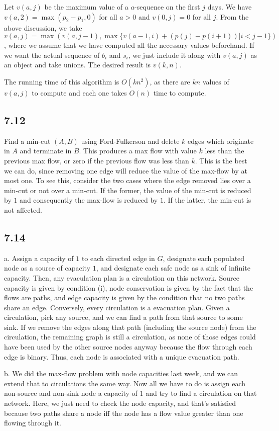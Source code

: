 \documentclass{article}
\begin{document}
Let $v(a,j)$ be the maximum value of a $a$-sequence on the first $j$ days. We have $v(a,2)=\max(p_2-p_1,0)$ for all $a>0$ and $v(0,j)=0$ for all $j$. From the above discussion, we take $v(a,j)=\max(v(a,j-1),\max\{v(a-1,i)+(p(j)-p(i+1))|i<j-1\})$, where we assume that we have computed all the necessary values beforehand. If we want the actual sequence of $b_i$ and $s_i$, we just include it along with $v(a,j)$ as an object and take unions. The desired result is $v(k,n)$.

The running time of this algorithm is $O(kn^2)$, as there are $kn$ values of $v(a,j)$ to compute and each one takes $O(n)$ time to compute.
\subsection*{7.12}
Find a min-cut $(A,B)$ using Ford-Fulkerson and delete $k$ edges which originate in $A$ and terminate in $B$. This produces a max flow with value $k$ less than the previous max flow, or zero if the previous flow was less than $k$. This is the best we can do, since removing one edge will reduce the value of the max-flow by at most one. To see this, consider the two cases where the edge removed lies over a min-cut or not over a min-cut. If the former, the value of the min-cut is reduced by $1$ and consequently the max-flow is reduced by $1$. If the latter, the min-cut is not affected.
\subsection*{7.14}
a. Assign a capacity of $1$ to each directed edge in $G$, designate each populated node as a source of capacity $1$, and designate each safe node as a sink of infinite capacity. Then, any evaculation plan is a circulation on this network. Source capacity is given by condition (i), node conservation is given by the fact that the flows are paths, and edge capacity is given by the condition that no two paths share an edge. Conversely, every circulation is a evacuation plan. Given a circulation, pick any source, and we can find a path from that source to some sink. If we remove the edges along that path (including the source node) from the circulation, the remaining graph is still a circulation, as none of those edges could have been used by the other source nodes anyway because the flow through each edge is binary. Thus, each node is associated with a unique evacuation path.

\noindent b. We did the max-flow problem with node capacities last week, and we can extend that to circulations the same way. Now all we have to do is assign each non-source and non-sink node a capacity of $1$ and try to find a circulation on that network. Here, we just need to check the node capacity, and that's satisfied because two paths share a node iff the node has a flow value greater than one flowing through it.
\end{document}
